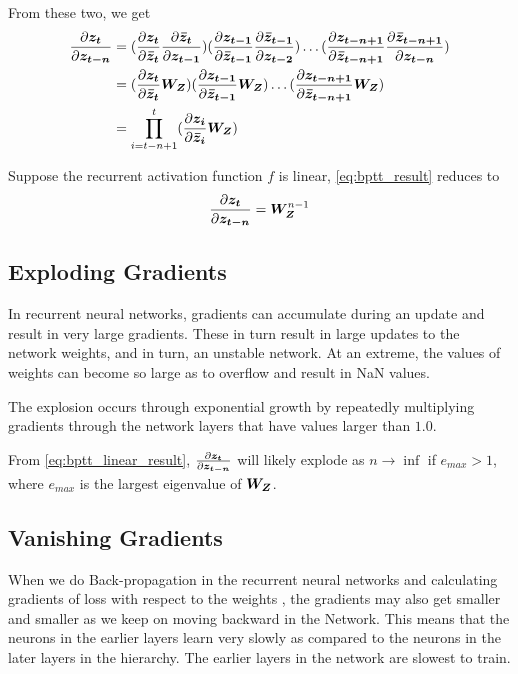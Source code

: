 From these two, we get
\begin{align} \label{eq:bptt_result}
\begin{split}
\frac{\partial \vect{z_t}}{\partial \vect{z_{t-n}}} &= (\frac{\partial \vect{z_t}}{\partial \vect{\bar{z}_{t}}}\frac{\partial \vect{\bar{z}_{t}}}{\partial \vect{z_{t-1}}})
(\frac{\partial \vect{z_{t-1}}}{\partial \vect{\bar{z}_{t-1}}}\frac{\partial \vect{\bar{z}_{t-1}}}{\partial \vect{z_{t-2}}}) \ldots 
(\frac{\partial \vect{z_{t-n+1}}}{\partial \vect{\bar{z}_{t-n+1}}}\frac{\partial \vect{\bar{z}_{t-n+1}}}{\partial \vect{z_{t-n}}}) \\
&= (\frac{\partial \vect{z_t}}{\partial \vect{\bar{z}_{t}}}\matr{W_Z})
(\frac{\partial \vect{z_{t-1}}}{\partial \vect{\bar{z}_{t-1}}}\matr{W_Z}) \ldots 
(\frac{\partial \vect{z_{t-n+1}}}{\partial \vect{\bar{z}_{t-n+1}}}\matr{W_Z}) \\
&= \prod\limits_{i=t-n+1}^{t} (\frac{\partial \vect{z_i}}{\partial \vect{\bar{z}_{i}}}\matr{W_Z})
\end{split}
\end{align}

Suppose the recurrent activation function $f$ is linear, \cref{eq:bptt_result} reduces to
\begin{equation} \label{eq:bptt_linear_result}
\frac{\partial \vect{z_t}}{\partial \vect{z_{t-n}}} = \matr{W_Z}^{n-1}
\end{equation}


\subsection{Exploding Gradients}
In recurrent neural networks, gradients can accumulate during an update and result in very large gradients. 
These in turn result in large updates to the network weights, and in turn, an unstable network. 
At an extreme, the values of weights can become so large as to overflow and result in NaN values.

The explosion occurs through exponential growth by repeatedly multiplying gradients through the network layers that have values larger than $1.0$.

From \cref{eq:bptt_linear_result}, $\frac{\partial \vect{z_t}}{\partial \vect{z_{t-n}}}$ will likely explode as $n \rightarrow \inf$ if $e_{max} > 1$, where $e_{max}$ is the largest eigenvalue of $\matr{W_Z}$.

\subsection{Vanishing Gradients}
When we do Back-propagation in the recurrent neural networks and calculating gradients of loss with respect to the weights , the gradients may also get smaller and smaller as we keep on moving backward in the Network. 
This means that the neurons in the earlier layers learn very slowly as compared to the neurons in the later layers in the hierarchy. 
The earlier layers in the network are slowest to train.

